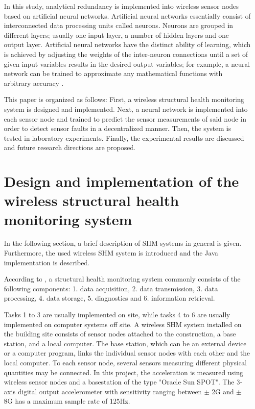 \documentclass[12pt,a4paper]{scrartcl}
\begin{document}
In this study, analytical redundancy is implemented into wireless sensor nodes based on artificial neural networks.
Artificial neural networks essentially consist of interconnected data processing units called neurons. 
Neurons are grouped in different layers; usually one input layer, a number of hidden layers and one output layer.
Artificial neural networks have the distinct ability of learning, which is achieved by adjusting the weights of the inter-neuron connections until a set of given input variables results in the desired output variables; for example, a neural network can be trained to approximate any mathematical functions with arbitrary accuracy \citep{Li2011}.

This paper is organized as follows:
First, a wireless structural health monitoring system is designed and implemented. 
Next, a neural network is implemented into each sensor node and trained to predict the sensor measurements of said node in order to detect sensor faults in a decentralized manner. 
Then, the system is tested in laboratory experiments. 
Finally, the experimental results are discussed and future research directions are proposed.


\newpage

\section*{Design and implementation of the wireless structural health monitoring system}
In the following section, a brief description of SHM systems in general is given. Furthermore, the used wireless SHM system is introduced and the Java implementation is described.

According to \cite[5]{BisbySHM}, a structural health monitoring system commonly consists of the following components:
1. data acquisition,
2. data transmission, 
3. data processing,
4. data storage,
5. diagnostics and 
6. information retrieval.

Tasks 1 to 3 are usually implemented on site, while tasks 4 to 6 are usually implemented on computer systems off site.
A wireless SHM system installed on the building site consists of sensor nodes attached to the construction, a base station, and a local computer. 
The base station, which can be an external device or a computer program, links the individual sensor nodes with each other and the local computer.
To each sensor node, several sensors measuring different physical quantities may be connected. 
In this project, the acceleration is measured using wireless sensor nodes and a basestation of the type "Oracle Sun SPOT". 
The 3-axis digital output accelerometer with sensitivity ranging between $ \pm $ 2G and $\pm$ 8G has a maximum sample rate of 125Hz. \cite[9]{eDemo2010}
\end{document}
